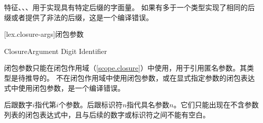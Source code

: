 \pnum
特征、、、用于实现具有特定后缀的字面量。
如果有多于一个类型实现了相同的后缀或者提供了非法的后缀，这是一个编译错误。

[lex.closure-args]{闭包参数}

\begin{bnf}{ClosureArgument}
    \terminal{\$} Digit\bnfp \br
    \terminal{\$} Identifier
\end{bnf}

\pnum
闭包参数只能在闭包作用域（\ref{scope.closure}）中使用，用于引用匿名参数。其类型是待推导的。
不在闭包作用域中使用闭包参数，或在显式指定参数的闭包表达式中使用闭包参数，是一个编译错误。

\pnum
\tcode{\$}后跟数字$i$指代第$i$个参数。\tcode{\$}后跟标识符$n$指代具名参数$n$。它们只能出现在不含参数列表的闭包表达式中，且\tcode{\$}与后续的数字或标识符之间不能有空白。

